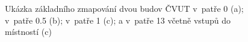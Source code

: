                       \begin{figure}
                    
                    \hfill
                    \hfill
                    \hfill

                    \caption{Ukázka základního zmapování dvou budov ČVUT v~patře 0 (a); v~patře 0.5 (b); v~patře 1 (c); a v~patře 13 včetně vstupů do místností (c)}
                    \label{obr43}
                    \end{figure}
                    

